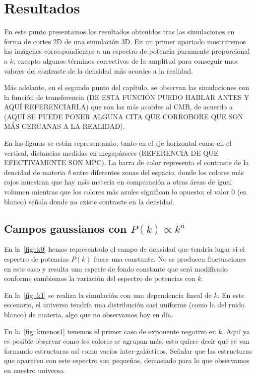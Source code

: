 \chapter{Resultados}
En este punto presentamos los resultados obtenidos tras las simulaciones en forma de cortes 2D de una simulación 3D. En un primer apartado mostraremos las imágenes correspondientes a un espectro de potencia puramente proporcional a \(k\), excepto algunos términos correctivos de la amplitud para conseguir unos valores del contraste de la densidad más acordes a la realidad.

Más adelante, en el segundo punto del capítulo, se observan las simulaciones con la función de transferencia (DE ESTA FUNCIÓN PUEDO HABLAR ANTES Y AQUÍ REFERENCIARLA) que son las más acordes al CMB, de acuerdo a (AQUÍ SE PUEDE PONER ALGUNA CITA QUE CORROBORE QUE SON MÁS CERCANAS A LA REALIDAD).

En las figuras se están representando, tanto en el eje horizontal como en el vertical, distancias medidas en megapársecs (REFERENCIA DE QUE EFECTIVAMENTE SON MPC). La barra de color representa el contraste de la densidad de materia \(\delta\) entre diferentes zonas del espacio, donde los colores más rojos muestran que hay más materia en comparación a otras áreas de igual volumen mientras que los colores más azules significan lo opuesto; el valor 0 (en blanco) señala donde no existe contraste en la densidad.

\section{Campos gaussianos con \texorpdfstring{\(P(k)\propto k^n\)}{espectro de potencias proporcional a una potencia de k}}
En la~\autoref{fig::k0} hemos representado el campo de densidad que tendría lugar si el espectro de potencias \(P(k)\) fuera una constante. No se producen fluctuaciones en este caso y resulta una especie de fondo constante que será modificado conforme cambiemos la variación del espectro de potencias con \(k\).

En la~\autoref{fig::k1} se realiza la simulación con una dependencia lineal de \(k\). En este escenario, el universo tendría una distribución casi uniforme (como la del ruido blanco) de materia, algo que no observamos hoy en día.

En la~\autoref{fig::kmenos1} tenemos el primer caso de exponente negativo en \(k\). Aquí ya es posible observar como los colores se agrupan más, esto quiere decir que se van formando estructuras así como vacíos inter-galácticos. Señalar que las estructuras que aparecen con este espectro son pequeñas, demasiado para lo que observamos en nuestro universo.

